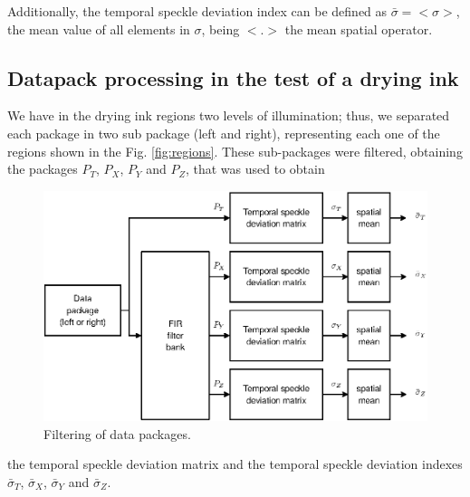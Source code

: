 \documentclass[review]{elsarticle}
\begin{document}
Additionally, the temporal speckle deviation index can be defined as $\bar{\sigma}=<\sigma>$, the mean value
of all elements in $\sigma$, being $<.>$ the mean spatial operator.

\subsection{Datapack processing in the test of a drying ink}
\label{subsec:numprocink}

We have in the drying ink regions
two levels of illumination; thus, we  separated each package in two sub package
(left and right), representing each one of the regions shown in the Fig. \ref{fig:regions}.
These sub-packages were filtered,
obtaining the packages $P_T$, $P_X$, $P_Y$ and $P_Z$, that was used to obtain
\begin{figure}[h!]
\centering
\includegraphics[width=0.65\columnwidth]{filtering.eps}
\caption{Filtering of data packages.}
\label{fig:filtering}
\end{figure}
the temporal speckle deviation matrix and the 
temporal speckle deviation indexes $\bar{\sigma}_T$, $\bar{\sigma}_X$, $\bar{\sigma}_Y$ and
$\bar{\sigma}_Z$.
\end{document}
